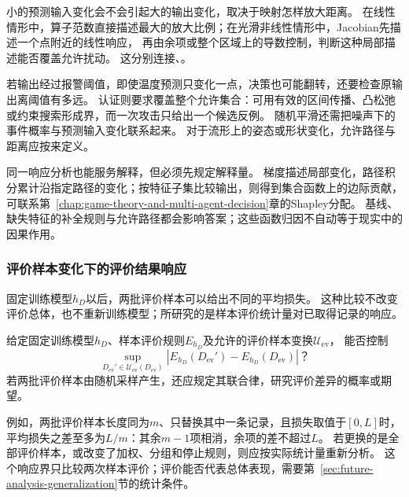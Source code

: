 小的预测输入变化会不会引起大的输出变化，取决于映射怎样放大距离。
在线性情形中，算子范数直接描述最大的放大比例；在光滑非线性情形中，Jacobian先描述一个点附近的线性响应，
再由余项或整个区域上的导数控制，判断这种局部描述能否覆盖允许扰动。
这分别连接、。

若输出经过报警阈值，即使温度预测只变化一点，决策也可能翻转，还要检查原输出离阈值有多远。
认证则要求覆盖整个允许集合：可用有效的区间传播、凸松弛或约束搜索形成界，而一次攻击只给出一个候选反例。
随机平滑还需把噪声下的事件概率与预测输入变化联系起来。
对于流形上的姿态或形状变化，允许路径与距离应按来定义。

同一响应分析也能服务解释，但必须先规定解释量。
梯度描述局部变化，路径积分累计沿指定路径的变化；按特征子集比较输出，则得到集合函数上的边际贡献，
可联系第~\ref{chap:game-theory-and-multi-agent-decision}章的Shapley分配。
基线、缺失特征的补全规则与允许路径都会影响答案；这些函数归因不自动等于现实中的因果作用。

\subsubsection{评价样本变化下的评价结果响应}
\label{sec:future-analysis-evaluation-sample-response}

固定训练模型$h_D$以后，两批评价样本可以给出不同的平均损失。
这种比较不改变评价总体，也不重新训练模型；所研究的是样本评价统计量对已取得记录的响应。

\begin{mathproblem}[评价样本变换造成的评价差异]
  \label{question:future-evaluation-sample-response}
  给定固定训练模型$h_D$、样本评价规则$E_{h_D}$及允许的评价样本变换$\mathcal U_{\mathrm{ev}}$，
  能否控制
  \[
    \sup_{D_{\mathrm{ev}}'\in\mathcal U_{\mathrm{ev}}(D_{\mathrm{ev}})}
      |E_{h_D}(D_{\mathrm{ev}}')-E_{h_D}(D_{\mathrm{ev}})|\text{？}
  \]
  若两批评价样本由随机采样产生，还应规定其联合律，研究评价差异的概率或期望。
\end{mathproblem}

例如，两批评价样本长度同为$m$、只替换其中一条记录，且损失取值于$[0,L]$时，
平均损失之差至多为$L/m$：其余$m-1$项相消，余项的差不超过$L$。
若更换的是全部评价样本，或改变了加权、分组和停止规则，则应按实际统计量重新分析。
这个响应界只比较两次样本评价；评价能否代表总体表现，需要第~\ref{sec:future-analysis-generalization}节的统计条件。

